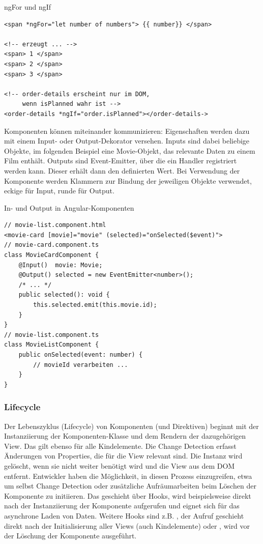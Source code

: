 \begin{listing}
\caption{ngFor und ngIf}
\label{lst:listing7}
\begin{verbatim}
<span *ngFor="let number of numbers"> {{ number}} </span>

<!-- erzeugt ... -->
<span> 1 </span>
<span> 2 </span>
<span> 3 </span>

<!-- order-details erscheint nur im DOM, 
     wenn isPlanned wahr ist -->
<order-details *ngIf="order.isPlanned"></order-details->
\end{verbatim}
\end{listing}

Komponenten können miteinander kommunizieren: Eigenschaften werden dazu mit einem Input- oder Output-Dekorator versehen. Inputs sind dabei beliebige Objekte, im folgenden Beispiel eine Movie-Objekt, das relevante Daten zu einem Film enthält. Outputs sind Event-Emitter, über die ein Handler registriert werden kann. Dieser erhält dann den definierten Wert. Bei Verwendung der Komponente werden Klammern zur Bindung der jeweiligen Objekte verwendet, eckige für Input, runde für Output.

\begin{listing}
\caption{In- und Output in Angular-Komponenten}
\label{lst:listing8}
\begin{verbatim}
// movie-list.component.html
<movie-card [movie]="movie" (selected)="onSelected($event)">
// movie-card.component.ts
class MovieCardComponent {
    @Input()  movie: Movie;
    @Output() selected = new EventEmitter<number>();
    /* ... */
    public selected(): void {
        this.selected.emit(this.movie.id);
    }
}
// movie-list.component.ts
class MovieListComponent {
    public onSelected(event: number) { 
        // movieId verarbeiten ...
    }
}
\end{verbatim}
\end{listing}

\subsubsection{Lifecycle}
Der Lebenszyklus (Lifecycle) von Komponenten (und Direktiven) beginnt mit der Instanziierung der Komponenten-Klasse und dem Rendern der dazugehörigen View. Das gilt ebenso für alle Kindelemente. Die Change Detection erfasst Änderungen von Properties, die für die View relevant sind. Die Instanz wird gelöscht, wenn sie nicht weiter benötigt wird und die View aus dem DOM entfernt. Entwickler haben die Möglichkeit, in diesen Prozess einzugreifen, etwa um selbst Change Detection oder zusätzliche Aufräumarbeiten beim Löschen der Komponente zu initiieren. Das geschieht über Hooks,  wird beispielsweise direkt nach der Instanziierung der Komponente aufgerufen und eignet sich für das asynchrone Laden von Daten. Weitere Hooks sind z.B. , der Aufruf geschieht direkt nach der Initialisierung aller Views (auch Kindelemente) oder , wird vor der Löschung der Komponente ausgeführt.\cite{AngularHooks}


